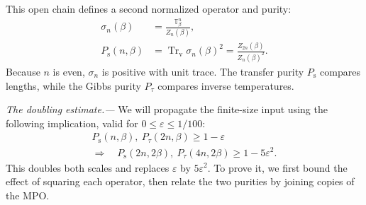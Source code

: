 \documentclass[aps,prl,reprint,amsmath,amssymb,nofootinbib,raggedbottom]{revtex4-2}
\newcommand{\Ps}{P_{\mathrm{s}}}
\newcommand{\Pt}{P_{\tau}}
\newcommand{\trv}{\operatorname{Tr}_{\mathrm v}}
\begin{document}
This open chain defines a second normalized operator and purity:
\begin{equation}
 \begin{aligned}
 \sigma_n(\beta)&=\frac{\mathbb T_\beta^n}{Z_n(\beta)},\\
 \Ps(n,\beta)&=\trv\sigma_n(\beta)^2
 =\frac{Z_{2n}(\beta)}{Z_n(\beta)^2}.
 \end{aligned}
 \label{eq:spatialpurity}
\end{equation}
Because $n$ is even, $\sigma_n$ is positive with unit trace.
The transfer purity $\Ps$ compares lengths, while the Gibbs purity
$\Pt$ compares inverse temperatures.

\emph{The doubling estimate.---}
We will propagate the finite-size input using the following implication,
valid for $0\le\varepsilon\le1/100$:
\begin{equation}
 \begin{gathered}
 \Ps(n,\beta),\ \Pt(2n,\beta)\ge1-\varepsilon\\
 \Longrightarrow\quad
 \Ps(2n,2\beta),\ \Pt(4n,2\beta)\ge1-5\varepsilon^2.
 \end{gathered}
 \label{eq:update}
\end{equation}
This doubles both scales and replaces $\varepsilon$ by $5\varepsilon^2$.
To prove it, we
first bound the effect of squaring each operator, then relate the two
purities by joining copies of the MPO.
\end{document}
